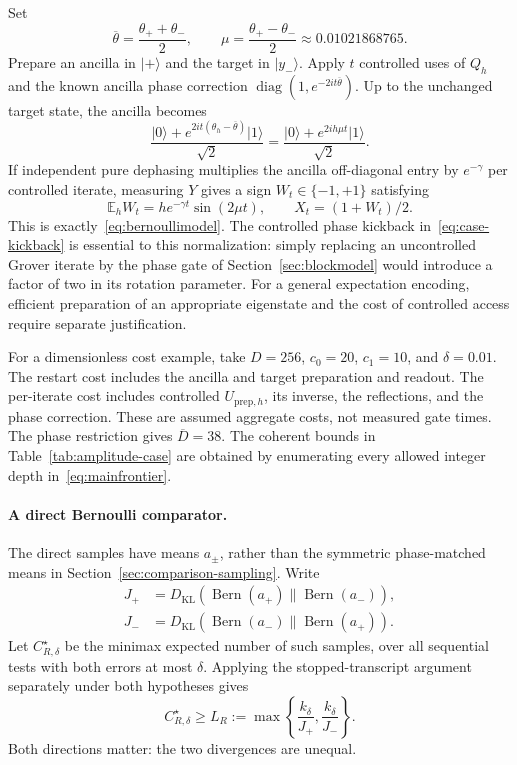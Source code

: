\documentclass[11pt,a4paper]{article}
\newcommand{\ket}[1]{\lvert #1\rangle}
\newcommand{\E}{\mathbb E}
\theoremstyle{definition}
\theoremstyle{remark}
\numberwithin{equation}{section}
\begin{document}
Set
\begin{equation}\label{eq:case-angle}
 \overline\theta=\frac{\theta_++\theta_-}{2},\qquad
 \mu=\frac{\theta_+-\theta_-}{2}
 \approx0.01021868765.
\end{equation}
Prepare an ancilla in $\ket{+}$ and the target in $\ket{y_-}$.
Apply $t$ controlled uses of $Q_h$ and the known ancilla phase correction
$\operatorname{diag}(1,e^{-2it\overline\theta})$. Up to the unchanged
target state, the ancilla becomes
\begin{equation}\label{eq:case-kickback}
 \frac{\ket{0}+e^{2it(\theta_h-\overline\theta)}\ket{1}}{\sqrt2}
 =\frac{\ket{0}+e^{2ih\mu t}\ket{1}}{\sqrt2}.
\end{equation}
If independent pure dephasing multiplies the ancilla off-diagonal entry
by $e^{-\gamma}$ per controlled iterate, measuring $Y$ gives a sign
$W_t\in\{-1,+1\}$ satisfying
\[
 \E_h W_t=h e^{-\gamma t}\sin(2\mu t),\qquad
 X_t=(1+W_t)/2.
\]
This is exactly~\eqref{eq:bernoullimodel}. The controlled phase kickback
in~\eqref{eq:case-kickback} is essential to this normalization: simply
replacing an uncontrolled Grover iterate by the phase gate of
Section~\ref{sec:blockmodel} would introduce a factor of two in its
rotation parameter. For a general expectation encoding, efficient
preparation of an appropriate eigenstate and the cost of controlled
access require separate justification.

For a dimensionless cost example, take $D=256$, $c_0=20$, $c_1=10$,
and $\delta=0.01$. The restart cost includes the ancilla and target
preparation and readout. The per-iterate cost includes controlled
$U_{\mathrm{prep},h}$, its inverse, the reflections, and the phase
correction. These are assumed aggregate costs, not measured gate times.
The phase restriction gives $\overline D=38$. The coherent bounds in
Table~\ref{tab:amplitude-case} are obtained by enumerating every allowed
integer depth in~\eqref{eq:mainfrontier}.

\paragraph{A direct Bernoulli comparator.}
The direct samples have means $a_\pm$, rather than the symmetric
phase-matched means in Section~\ref{sec:comparison-sampling}. Write
\begin{equation}\label{eq:case-bernoulli-kl}
 \begin{split}
 J_+&=D_{\mathrm{KL}}(\operatorname{Bern}(a_+)\|
                      \operatorname{Bern}(a_-)),\\
 J_-&=D_{\mathrm{KL}}(\operatorname{Bern}(a_-)\|
                      \operatorname{Bern}(a_+)).
 \end{split}
\end{equation}
Let $C_{R,\delta}^\star$ be the minimax expected number of such samples,
over all sequential tests with both errors at most $\delta$. Applying
the stopped-transcript argument separately under both hypotheses gives
\begin{equation}\label{eq:case-classical-lower}
 C_{R,\delta}^\star\geq
 L_R:=\max\left\{\frac{k_\delta}{J_+},\frac{k_\delta}{J_-}\right\}.
\end{equation}
Both directions matter: the two divergences are unequal.
\end{document}
